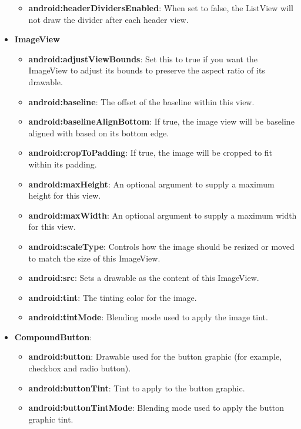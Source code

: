 \documentclass{report}
\begin{document}
\begin{itemize}
\begin{itemize}
                \item \textbf{android:headerDividersEnabled}:	When set to false, the ListView will not draw the divider after each header view. 
            \end{itemize}
        \item \textbf{ImageView}
            \begin{itemize}
                \item \textbf{android:adjustViewBounds}:	Set this to true if you want the ImageView to adjust its bounds to preserve the aspect ratio of its drawable. 
                \item \textbf{android:baseline}:	The offset of the baseline within this view. 
                \item \textbf{android:baselineAlignBottom}:	If true, the image view will be baseline aligned with based on its bottom edge. 
                \item \textbf{android:cropToPadding}:	If true, the image will be cropped to fit within its padding. 
                \item \textbf{android:maxHeight}:	An optional argument to supply a maximum height for this view. 
                \item \textbf{android:maxWidth}:	An optional argument to supply a maximum width for this view. 
                \item \textbf{android:scaleType}:	Controls how the image should be resized or moved to match the size of this ImageView. 
                \item \textbf{android:src}:	Sets a drawable as the content of this ImageView. 
                \item \textbf{android:tint}:	The tinting color for the image. 
                \item \textbf{android:tintMode}:	Blending mode used to apply the image tint. 
            \end{itemize}
        \item \textbf{CompoundButton}:
            \begin{itemize}
                \item \textbf{android:button}:	Drawable used for the button graphic (for example, checkbox and radio button). 
                \item \textbf{android:buttonTint}:	Tint to apply to the button graphic. 
                \item \textbf{android:buttonTintMode}:	Blending mode used to apply the button graphic tint. 

\end{itemize}
\end{itemize}
\end{document}
